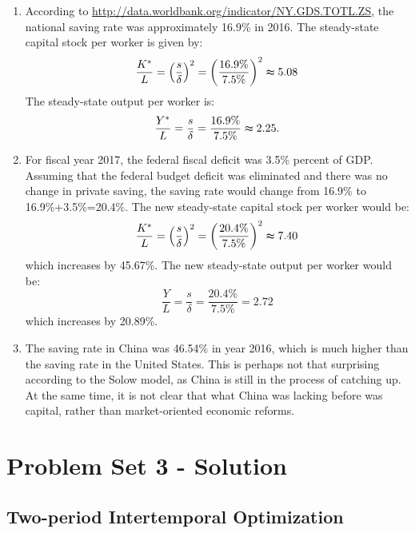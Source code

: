 \documentclass[]{book}
\theoremstyle{definition}
\theoremstyle{definition}
\theoremstyle{definition}
\theoremstyle{remark}
\begin{document}
\begin{enumerate}
\def\labelenumi{\arabic{enumi}.}
\item
  According to \url{http://data.worldbank.org/indicator/NY.GDS.TOTL.ZS},
  the national saving rate was approximately 16.9\% in 2016. The
  steady-state capital stock per worker is given by:
  \[\frac{K^{*}}{L}=\left(\frac{s}{\delta}\right)^{2}=\left(\frac{16.9\%}{7.5\%}\right)^{2}\thickapprox5.08\]
  The steady-state output per worker is:
  \[\frac{Y^{*}}{L}=\frac{s}{\delta}=\frac{16.9\%}{7.5\%}\thickapprox2.25.\]
\item
  For fiscal year 2017, the federal fiscal deficit was 3.5\% percent of
  GDP. Assuming that the federal budget deficit was eliminated and there
  was no change in private saving, the saving rate would change from
  16.9\% to 16.9\%+3.5\%=20.4\%. The new steady-state capital stock per
  worker would be:
  \[\frac{K^{*}}{L}=\left(\frac{s}{\delta}\right)^{2}=\left(\frac{20.4\%}{7.5\%}\right)^{2}\thickapprox7.40\]
  which increases by 45.67\%. The new steady-state output per worker
  would be: \[\frac{Y}{L}=\frac{s}{\delta}=\frac{20.4\%}{7.5\%}=2.72\]
  which increases by 20.89\%.
\item
  The saving rate in China was 46.54\% in year 2016, which is much
  higher than the saving rate in the United States. This is perhaps not
  that surprising according to the Solow model, as China is still in the
  process of catching up. At the same time, it is not clear that what
  China was lacking before was capital, rather than market-oriented
  economic reforms.
\end{enumerate}

\hypertarget{pset3-sol}{\chapter{Problem Set 3 -
Solution}\label{pset3-sol}}

\section{Two-period Intertemporal
Optimization}\label{two-period-intertemporal-optimization-1}
\end{document}
